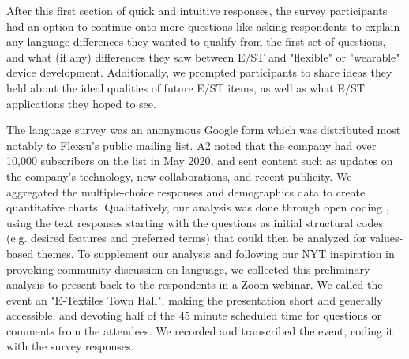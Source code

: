 \documentclass[manuscript,review,anonymous]{acmart}
\begin{document}
After this first section of quick and intuitive responses, the survey participants had an option to continue onto more questions like asking respondents to explain any language differences they wanted to qualify from the first set of questions, and what (if any) differences they saw between E/ST and "flexible" or "wearable" device development. Additionally, we prompted participants to share ideas they held about the ideal qualities of future E/ST items, as well as what E/ST applications they hoped to see.


The language survey was an anonymous Google form which was distributed most notably to Flexsu's public mailing list. A2 noted that the company had over 10,000 subscribers on the list in May 2020, and sent content such as updates on the company's technology, new collaborations, and recent publicity.
We aggregated the multiple-choice responses and demographics data to create quantitative charts. Qualitatively, our analysis was done through open coding \cite{denzin_sage_2005}, using the text responses starting with the questions as initial structural codes (e.g. desired features and preferred terms) that could then be analyzed for values-based themes. To supplement our analysis and following our NYT inspiration in provoking community discussion on language, we collected this preliminary analysis to present back to the respondents in a Zoom webinar. We called the event an "E-Textiles Town Hall", making the presentation short and generally accessible, and devoting half of the 45 minute scheduled time for questions or comments from the attendees. We recorded and transcribed the event, coding it with the survey responses. %
\end{document}
